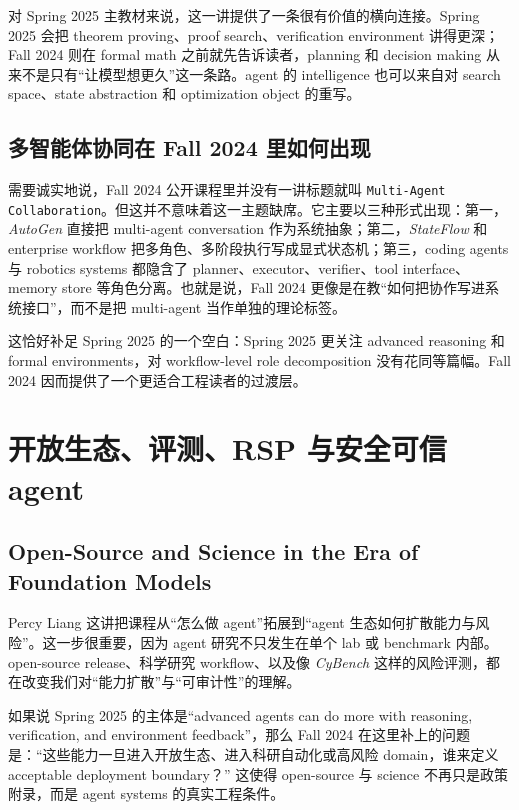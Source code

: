 对 Spring 2025 主教材来说，这一讲提供了一条很有价值的横向连接。Spring 2025 会把 theorem proving、proof search、verification environment 讲得更深；Fall 2024 则在 formal math 之前就先告诉读者，planning 和 decision making 从来不是只有“让模型想更久”这一条路。agent 的 intelligence 也可以来自对 search space、state abstraction 和 optimization object 的重写。

\subsection{多智能体协同在 Fall 2024 里如何出现}

需要诚实地说，Fall 2024 公开课程里并没有一讲标题就叫 \texttt{Multi-Agent Collaboration}。但这并不意味着这一主题缺席。它主要以三种形式出现：第一，\textit{AutoGen} 直接把 multi-agent conversation 作为系统抽象；第二，\textit{StateFlow} 和 enterprise workflow 把多角色、多阶段执行写成显式状态机；第三，coding agents 与 robotics systems 都隐含了 planner、executor、verifier、tool interface、memory store 等角色分离。也就是说，Fall 2024 更像是在教“如何把协作写进系统接口”，而不是把 multi-agent 当作单独的理论标签。

这恰好补足 Spring 2025 的一个空白：Spring 2025 更关注 advanced reasoning 和 formal environments，对 workflow-level role decomposition 没有花同等篇幅。Fall 2024 因而提供了一个更适合工程读者的过渡层。

\section{开放生态、评测、RSP 与安全可信 agent}

\subsection{Open-Source and Science in the Era of Foundation Models}

Percy Liang 这讲把课程从“怎么做 agent”拓展到“agent 生态如何扩散能力与风险”。这一步很重要，因为 agent 研究不只发生在单个 lab 或 benchmark 内部。open-source release、科学研究 workflow、以及像 \textit{CyBench} 这样的风险评测，都在改变我们对“能力扩散”与“可审计性”的理解。

如果说 Spring 2025 的主体是“advanced agents can do more with reasoning, verification, and environment feedback”，那么 Fall 2024 在这里补上的问题是：“这些能力一旦进入开放生态、进入科研自动化或高风险 domain，谁来定义 acceptable deployment boundary？” 这使得 open-source 与 science 不再只是政策附录，而是 agent systems 的真实工程条件。

